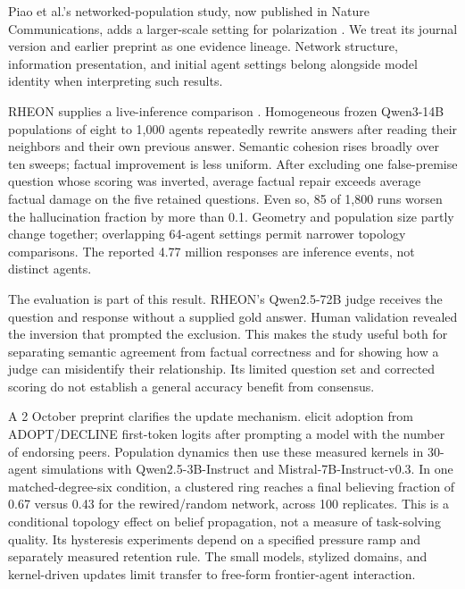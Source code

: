 Piao et al.'s networked-population study, now published in Nature Communications, adds a larger-scale setting for polarization \citep{piao-polarization}. We treat its journal version and earlier preprint as one evidence lineage. Network structure, information presentation, and initial agent settings belong alongside model identity when interpreting such results.

RHEON supplies a live-inference comparison \citep{rheon-consensus}. Homogeneous frozen Qwen3-14B populations of eight to 1,000 agents repeatedly rewrite answers after reading their neighbors and their own previous answer. Semantic cohesion rises broadly over ten sweeps; factual improvement is less uniform. After excluding one false-premise question whose scoring was inverted, average factual repair exceeds average factual damage on the five retained questions. Even so, 85 of 1,800 runs worsen the hallucination fraction by more than 0.1. Geometry and population size partly change together; overlapping 64-agent settings permit narrower topology comparisons. The reported 4.77 million responses are inference events, not distinct agents.

The evaluation is part of this result. RHEON's Qwen2.5-72B judge receives the question and response without a supplied gold answer. Human validation revealed the inversion that prompted the exclusion. This makes the study useful both for separating semantic agreement from factual correctness and for showing how a judge can misidentify their relationship. Its limited question set and corrected scoring do not establish a general accuracy benefit from consensus.

A 2 October preprint clarifies the update mechanism. \citet{coherence-driven-contagion} elicit adoption from ADOPT/DECLINE first-token logits after prompting a model with the number of endorsing peers. Population dynamics then use these measured kernels in 30-agent simulations with Qwen2.5-3B-Instruct and Mistral-7B-Instruct-v0.3. In one matched-degree-six condition, a clustered ring reaches a final believing fraction of 0.67 versus 0.43 for the rewired/random network, across 100 replicates. This is a conditional topology effect on belief propagation, not a measure of task-solving quality. Its hysteresis experiments depend on a specified pressure ramp and separately measured retention rule. The small models, stylized domains, and kernel-driven updates limit transfer to free-form frontier-agent interaction.

